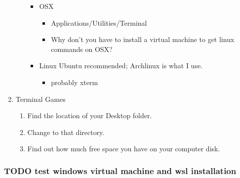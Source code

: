 \documentclass{article}
\begin{document}
\begin{enumerate}
\begin{enumerate}
\begin{itemize}
\item OSX
\begin{itemize}
\item Applications/Utilities/Terminal
\item Why don't you have to install a virtual machine to get linux commands on OSX?
\end{itemize}
\item Linux 
Ubuntu recommended; Archlinux is what I use. 
\begin{itemize}
\item probably xterm
\end{itemize}
\end{itemize}
\end{enumerate}
\item Terminal Games
\label{sec:orga0146dc}
\begin{enumerate}
\item Find the location of your Desktop folder.
\item Change to that directory.
\item Find out how much free space you have on your computer disk.
\end{enumerate}
\end{enumerate}
\subsubsection{{\bfseries\sffamily TODO} test windows virtual machine and wsl installation}
\label{sec:orgeecb45a}
\end{document}
